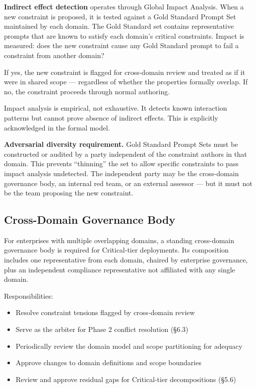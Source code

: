 \textbf{Indirect effect detection} operates through Global Impact Analysis. When a new constraint is proposed, it is tested against a Gold Standard Prompt Set maintained by each domain. The Gold Standard set contains representative prompts that are known to satisfy each domain's critical constraints. Impact is measured: does the new constraint cause any Gold Standard prompt to fail a constraint from another domain?

If yes, the new constraint is flagged for cross-domain review and treated as if it were in shared scope --- regardless of whether the properties formally overlap. If no, the constraint proceeds through normal authoring.

Impact analysis is empirical, not exhaustive. It detects known interaction patterns but cannot prove absence of indirect effects. This is explicitly acknowledged in the formal model.

\textbf{Adversarial diversity requirement.} Gold Standard Prompt Sets must be constructed or audited by a party independent of the constraint authors in that domain. This prevents ``thinning'' the set to allow specific constraints to pass impact analysis undetected. The independent party may be the cross-domain governance body, an internal red team, or an external assessor --- but it must not be the team proposing the new constraint.

\subsection{Cross-Domain Governance Body}


For enterprises with multiple overlapping domains, a standing cross-domain governance body is required for Critical-tier deployments. Its composition includes one representative from each domain, chaired by enterprise governance, plus an independent compliance representative not affiliated with any single domain.

Responsibilities:

\begin{itemize}
  \item Resolve constraint tensions flagged by cross-domain review
  \item Serve as the arbiter for Phase 2 conflict resolution (\S{}6.3)
  \item Periodically review the domain model and scope partitioning for adequacy
  \item Approve changes to domain definitions and scope boundaries
  \item Review and approve residual gaps for Critical-tier decompositions (\S{}5.6)
\end{itemize}


